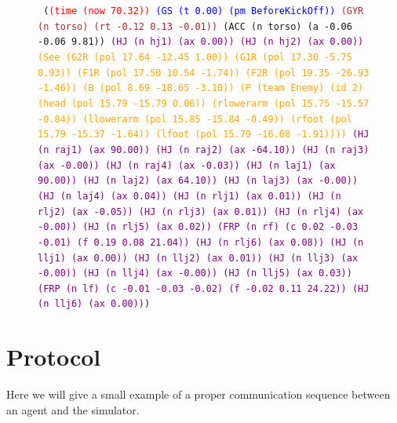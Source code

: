 \begin{figure}[t]
\begin{center}
\texttt{\small
(\textcolor{Red}{(time (now 70.32))} \textcolor{Blue}{(GS (t 0.00) (pm BeforeKickOff))} \textcolor{Brown}{(GYR (n torso) (rt -0.12 0.13 -0.01))} \textcolor{OliveGreen}{(ACC (n torso) (a -0.06 -0.06 9.81))} \textcolor{Purple}{(HJ (n hj1) (ax 0.00)) (HJ (n hj2) (ax 0.00))} \textcolor{Orange}{(See (G2R (pol 17.64 -12.45 1.00)) (G1R (pol 17.30 -5.75 0.93)) (F1R (pol 17.50 10.54 -1.74)) (F2R (pol 19.35 -26.93 -1.46)) (B (pol 8.69 -18.65 -3.10)) (P (team Enemy) (id 2) (head (pol 15.79 -15.79 0.06)) (rlowerarm (pol 15.75 -15.57 -0.84)) (llowerarm (pol 15.85 -15.84 -0.49)) (rfoot (pol 15.79 -15.37 -1.64)) (lfoot (pol 15.79 -16.08 -1.91))))} \textcolor{Purple}{(HJ (n raj1) (ax 90.00)) (HJ (n raj2) (ax -64.10)) (HJ (n raj3) (ax -0.00)) (HJ (n raj4) (ax -0.03)) (HJ (n laj1) (ax 90.00)) (HJ (n laj2) (ax 64.10)) (HJ (n laj3) (ax -0.00)) (HJ (n laj4) (ax 0.04)) (HJ (n rlj1) (ax 0.01)) (HJ (n rlj2) (ax -0.05)) (HJ (n rlj3) (ax 0.01)) (HJ (n rlj4) (ax -0.00)) (HJ (n rlj5) (ax 0.02)) (FRP (n rf) (c 0.02 -0.03 -0.01) (f 0.19 0.08 21.04)) (HJ (n rlj6) (ax 0.08)) (HJ (n llj1) (ax 0.00)) (HJ (n llj2) (ax 0.01)) (HJ (n llj3) (ax -0.00)) (HJ (n llj4) (ax -0.00)) (HJ (n llj5) (ax 0.03)) (FRP (n lf) (c -0.01 -0.03 -0.02) (f -0.02 0.11 24.22)) (HJ (n llj6) (ax 0.00))})
}
	\label{fig:sensemsg}
\end{center}
\end{figure}

\section{Protocol}

Here we will give a small example of a proper communication sequence between an agent and the simulator.

